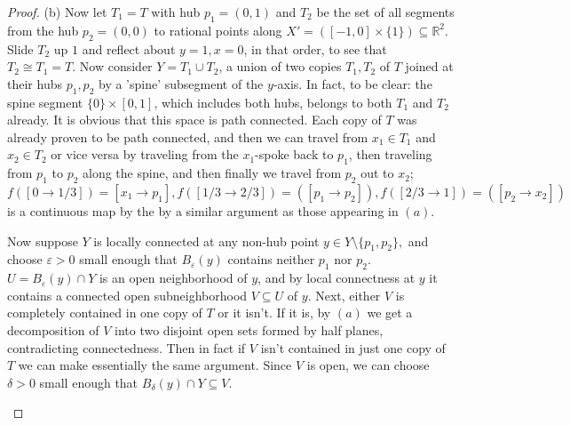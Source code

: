 \documentclass[addpoints,10pt]{exam}
\theoremstyle{plain}
\theoremstyle{definition}
\theoremstyle{plain}
\theoremstyle{definition}
\newcommand{\RR}{\ensuremath{\mathbb{R}}}
\begin{document}
\begin{proof}
\newpage
(b) Now let $T_{1}=T$ with hub $p_{1}=(0,1)$ and $T_{2}$ be the set of all segments from the hub $p_{2}=(0,0)$ to rational points along $X'=([-1,0]\times \{1\})\subseteq \RR^{2}$. Slide $T_{2}$ up $1$ and reflect about $y=1, x=0$, in that order, to see that $T_{2}\cong T_{1}=T.$ Now consider $Y=T_{1}\cup T_{2}$, a union of two copies $T_{1},T_{2}$ of $T$ joined at their hubs $p_{1},p_{2}$ by a 'spine' subsegment of the $y$-axis. In fact, to be clear: the spine segment $\{0\}\times [0,1]$, which includes both hubs, belongs to both $T_{1}$ and $T_{2}$ already. It is obvious that this space is path connected. Each copy of $T$ was already proven to be path connected, and then we can travel from $x_{1}\in T_{1}$ and $x_{2}\in T_{2}$ or vice versa by traveling from the $x_{1}$-spoke back to $p_{1}$, then traveling from $p_{1}$ to $p_{2}$ along the spine, and then finally we travel from $p_{2}$ out to $x_{2}$; $f([0\to 1/3])=[x_{1}\to p_{1}],f([1/3\to2/3])=([p_{1}\to p_{2}]),f([2/3\to 1])=([p_{2}\to x_{2}])$ is a continuous map by the by a similar argument as those appearing in $(a).$

Now suppose $Y$ is locally connected at any non-hub point $y\in Y\setminus\{p_{1},p_{2}\},$ and choose $\varepsilon>0$ small enough that $B_{\varepsilon}(y)$ contains neither $p_{1}$ nor $p_{2}.$ $U=B_{\varepsilon}(y)\cap Y$ is an open neighborhood of $y$, and by local connectness at $y$ it contains a connected open subneighborhood $V\subseteq U$ of $y$. Next, either $V$ is completely contained in one copy of $T$ or it isn't. If it is, by $(a)$ we get a decomposition of $V$ into two disjoint open sets formed by half planes, contradicting connectedness. Then in fact if $V$ isn't contained in just one copy of $T$ we can make essentially the same argument. Since $V$ is open, we can choose $\delta>0$ small enough that $B_{\delta}(y)\cap Y\subseteq V.$

\begin{figure}[h]
    \centering
\end{figure}
\end{proof}
\end{document}
